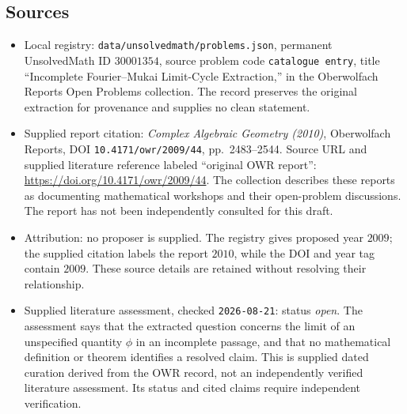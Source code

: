 \documentclass[11pt]{article}
\begin{document}
\subsection{Sources}
\begin{itemize}
\item Local registry: \texttt{data/unsolvedmath/problems.json}, permanent UnsolvedMath ID \(30001354\), source problem code \texttt{catalogue entry}, title ``Incomplete Fourier--Mukai Limit-Cycle Extraction,'' in the Oberwolfach Reports Open Problems collection. The record preserves the original extraction for provenance and supplies no clean statement.
\item Supplied report citation: \emph{Complex Algebraic Geometry (2010)}, Oberwolfach Reports, DOI \texttt{10.4171/owr/2009/44}, pp.\ 2483--2544. Source URL and supplied literature reference labeled ``original OWR report'': \url{https://doi.org/10.4171/owr/2009/44}. The collection describes these reports as documenting mathematical workshops and their open-problem discussions. The report has not been independently consulted for this draft.
\item Attribution: no proposer is supplied. The registry gives proposed year \(2009\); the supplied citation labels the report \(2010\), while the DOI and year tag contain \(2009\). These source details are retained without resolving their relationship.
\item Supplied literature assessment, checked \texttt{2026-08-21}: status \emph{open}. The assessment says that the extracted question concerns the limit of an unspecified quantity \(\phi\) in an incomplete passage, and that no mathematical definition or theorem identifies a resolved claim. This is supplied dated curation derived from the OWR record, not an independently verified literature assessment. Its status and cited claims require independent verification.
\end{itemize}
\end{document}
